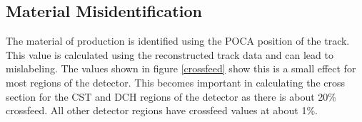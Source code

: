 \subsection{Material Misidentification}
	The material of \deltaray production is identified using the POCA position of the \deltaray track. This value is calculated using the reconstructed track data and can lead to mislabeling. The values shown in figure \ref{crossfeed} show this is a small effect for most regions of the detector. This becomes important in calculating the cross section for the CST and DCH regions of the detector as there is about 20\% crossfeed. All other detector regions have crossfeed values at about 1\%.
